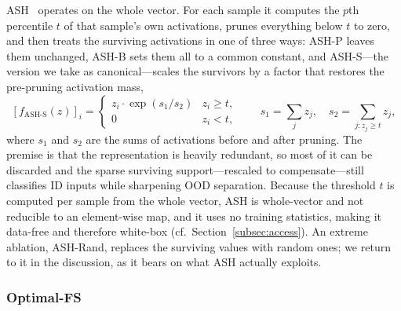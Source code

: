 \documentclass[a4paper]{article}
\begin{document}
ASH~\citep{ash} operates on the whole vector. For each sample it computes the $p$th
percentile $t$ of that sample's own activations, prunes everything below $t$ to
zero, and then treats the surviving activations in one of three ways: ASH-P leaves
them unchanged, ASH-B sets them all to a common constant, and ASH-S---the version we
take as canonical---scales the survivors by a factor that restores the pre-pruning
activation mass,
\begin{equation}
\label{eq:ash}
[f_{\mathrm{ASH\text{-}S}}(z)]_{i} =
\begin{cases}
z_i \cdot \exp\!\left( s_1 / s_2 \right) & z_i \geq t,\\[2pt]
0 & z_i < t,
\end{cases}
\qquad
s_1 = \sum_j z_j, \quad s_2 = \sum_{j : z_j \geq t} z_j ,
\end{equation}
where $s_1$ and $s_2$ are the sums of activations before and after pruning. The
premise is that the representation is heavily redundant, so most of it can be
discarded and the sparse surviving support---rescaled to compensate---still
classifies ID inputs while sharpening OOD separation. Because the threshold $t$ is
computed per sample from the whole vector, ASH is whole-vector and not reducible to
an element-wise map, and it uses no training statistics, making it data-free and
therefore white-box (cf.\ Section~\ref{subsec:access}). An extreme ablation, ASH-Rand, replaces the
surviving values with random ones; we return to it in the discussion, as it bears on
what ASH actually exploits.

\subsubsection{Optimal-FS}
\label{subsec:optfs}
\end{document}

